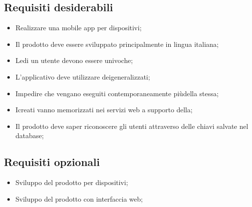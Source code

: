 \subsection{Requisiti desiderabili}
\begin{itemize}
	\item Realizzare una mobile app per dispositivi;
	\item Il prodotto deve essere sviluppato principalmente in lingua italiana;
	\item Ledi un utente devono essere univoche;
	\item L'applicativo deve utilizzare deigeneralizzati;
	\item Impedire che vengano eseguiti contemporaneamente piùdella stessa;
	\item Icreati vanno memorizzati nei servizi web a supporto della;
	\item Il prodotto deve saper riconoscere gli utenti attraverso delle chiavi salvate nel database;
\end{itemize}
\subsection{Requisiti opzionali}
\begin{itemize}
	\item Sviluppo del prodotto per dispositivi;
	\item Sviluppo del prodotto con interfaccia web;
\end{itemize}